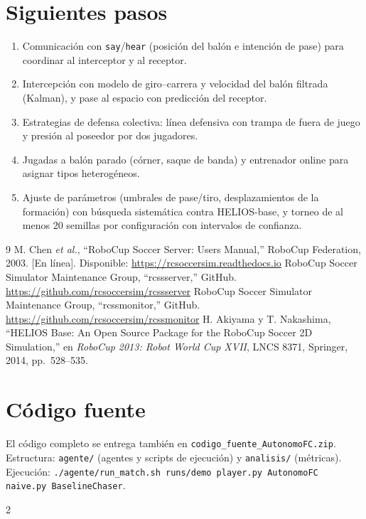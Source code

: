 \documentclass[conference,10pt]{IEEEtran}
\begin{document}
\section{Siguientes pasos}
\begin{enumerate}
\item Comunicación con \texttt{say}/\texttt{hear} (posición del balón e
intención de pase) para coordinar al interceptor y al receptor.
\item Intercepción con modelo de giro--carrera y velocidad del balón
filtrada (Kalman), y pase al espacio con predicción del receptor.
\item Estrategias de defensa colectiva: línea defensiva con trampa de fuera de
juego y presión al poseedor por dos jugadores.
\item Jugadas a balón parado (córner, saque de banda) y entrenador online
para asignar tipos heterogéneos.
\item Ajuste de parámetros (umbrales de pase/tiro, desplazamientos de la
formación) con búsqueda sistemática contra HELIOS-base, y torneo de al menos
20 semillas por configuración con intervalos de confianza.
\end{enumerate}

\begin{thebibliography}{9}
 M. Chen \emph{et al.}, ``RoboCup Soccer Server: Users
Manual,'' RoboCup Federation, 2003. [En línea]. Disponible:
\url{https://rcsoccersim.readthedocs.io}
 RoboCup Soccer Simulator Maintenance Group,
``rcssserver,'' GitHub. \url{https://github.com/rcsoccersim/rcssserver}
 RoboCup Soccer Simulator Maintenance Group,
``rcssmonitor,'' GitHub. \url{https://github.com/rcsoccersim/rcssmonitor}
 H. Akiyama y T. Nakashima, ``HELIOS Base: An Open Source
Package for the RoboCup Soccer 2D Simulation,'' en \emph{RoboCup 2013: Robot
World Cup XVII}, LNCS 8371, Springer, 2014, pp.~528--535.
\end{thebibliography}

\clearpage
\onecolumn
\appendices
\section{Código fuente}
El código completo se entrega también en \texttt{codigo\_fuente\_AutonomoFC.zip}.
Estructura: \texttt{agente/} (agentes y scripts de ejecución) y
\texttt{analisis/} (métricas). Ejecución: \texttt{./agente/run\_match.sh
runs/demo player.py AutonomoFC naive.py BaselineChaser}.
\begin{multicols}{2}







\end{multicols}
\end{document}

